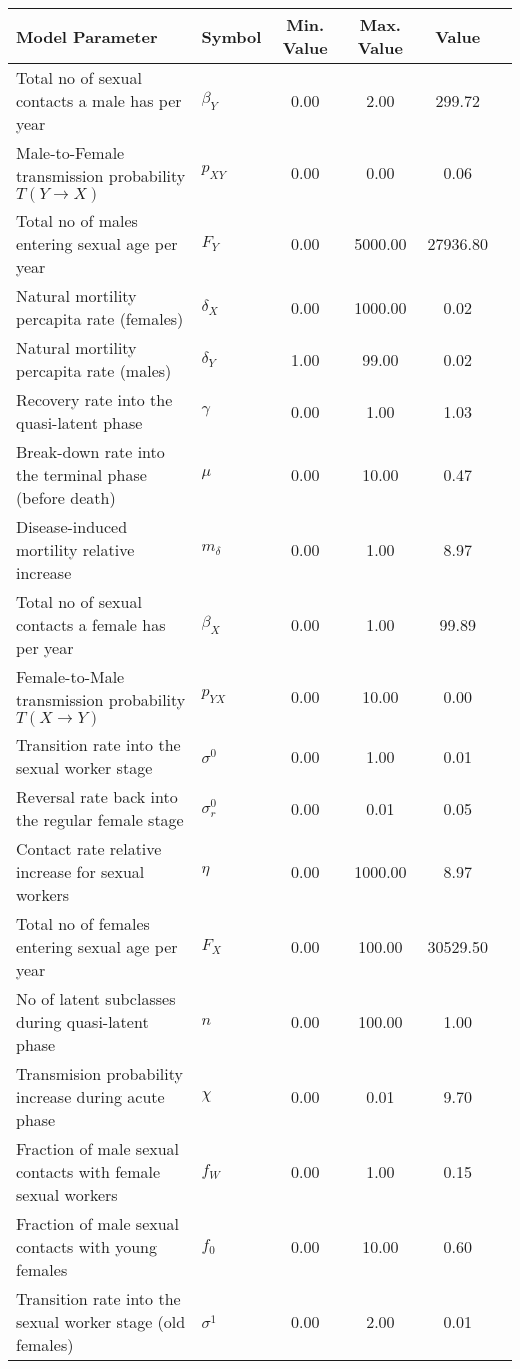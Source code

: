 \begin{table}
\centering
\begin{tabular}{p{5cm}lcccc}
{\bf Model Parameter} & {\bf Symbol} & {\bf Min. Value} & {\bf Max. Value} & {\bf Value}\\
\hline\hline
Total no of sexual contacts a male has per year & $\beta_Y$ & 0.00 & 2.00 & 299.72\\
Male-to-Female transmission probability $T(Y\rightarrow X)$ & $p_{XY}$ & 0.00 & 0.00 & 0.06\\
Total no of males entering sexual age per year & $F_Y$ & 0.00 & 5000.00 & 27936.80\\
Natural mortility percapita rate (females) & $\delta_X$ & 0.00 & 1000.00 & 0.02\\
Natural mortility percapita rate (males) & $\delta_Y$ & 1.00 & 99.00 & 0.02\\
Recovery rate into the quasi-latent phase & $\gamma$ & 0.00 & 1.00 & 1.03\\
Break-down rate into the terminal phase (before death) & $\mu$ & 0.00 & 10.00 & 0.47\\
Disease-induced mortility relative increase & $m_{\delta}$ & 0.00 & 1.00 & 8.97\\
Total no of sexual contacts a female has per year & $\beta_X$ & 0.00 & 1.00 & 99.89\\
Female-to-Male transmission probability $T(X\rightarrow Y)$ & $p_{YX}$ & 0.00 & 10.00 & 0.00\\
Transition rate into the sexual worker stage & $\sigma^0$ & 0.00 & 1.00 & 0.01\\
Reversal rate back into the regular female stage & $\sigma^0_r$ & 0.00 & 0.01 & 0.05\\
Contact rate relative increase for sexual workers & $\eta$ & 0.00 & 1000.00 & 8.97\\
Total no of females entering sexual age per year & $F_X$ & 0.00 & 100.00 & 30529.50\\
No of latent subclasses during quasi-latent phase & $n$ & 0.00 & 100.00 & 1.00\\
Transmision probability increase during acute phase & $\chi$ & 0.00 & 0.01 & 9.70\\
Fraction of male sexual contacts with female sexual workers & $f_W$ & 0.00 & 1.00 & 0.15\\
Fraction of male sexual contacts with young females & $f_0$ & 0.00 & 10.00 & 0.60\\
Transition rate into the sexual worker stage (old females) & $\sigma^1$ & 0.00 & 2.00 & 0.01\\

\end{tabular}
\end{table}
